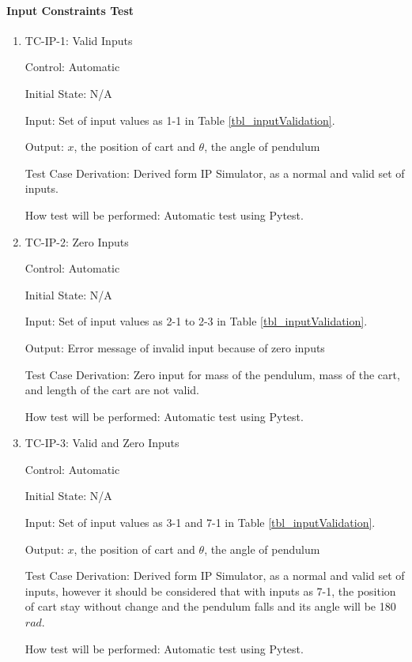 \documentclass[12pt, titlepage]{article}
\begin{document}
 
\paragraph{Input Constraints Test}

\begin{enumerate}

\item{TC-IP-1: Valid Inputs}

Control: Automatic
					
Initial State: N/A 
					
Input: Set of input values as 1-1 in Table \ref{tbl_inputValidation}.
					
Output: $x$, the position of cart and $\theta$, the angle of pendulum

Test Case Derivation: Derived form IP Simulator, as a normal and valid set of inputs.
					
How test will be performed: Automatic test using Pytest.

\item{TC-IP-2: Zero Inputs}

Control: Automatic
					
Initial State: N/A 
					
Input: Set of input values as 2-1 to 2-3 in Table \ref{tbl_inputValidation}.
					
Output: Error message of invalid input because of zero inputs

Test Case Derivation: Zero input for mass of the pendulum, mass of the cart, and length of the cart are not valid.
					
How test will be performed: Automatic test using Pytest.

\item{TC-IP-3: Valid and Zero Inputs}

Control: Automatic
					
Initial State: N/A 
					
Input: Set of input values as 3-1  and 7-1 in Table \ref{tbl_inputValidation}.
					
Output: $x$, the position of cart and $\theta$, the angle of pendulum

Test Case Derivation: Derived form IP Simulator, as a normal and valid set of inputs, however it should be considered that with inputs as 7-1, the position of cart stay without change and the pendulum falls and its angle will be 180 $rad$.
					
How test will be performed: Automatic test using Pytest.


\end{enumerate}
\end{document}
